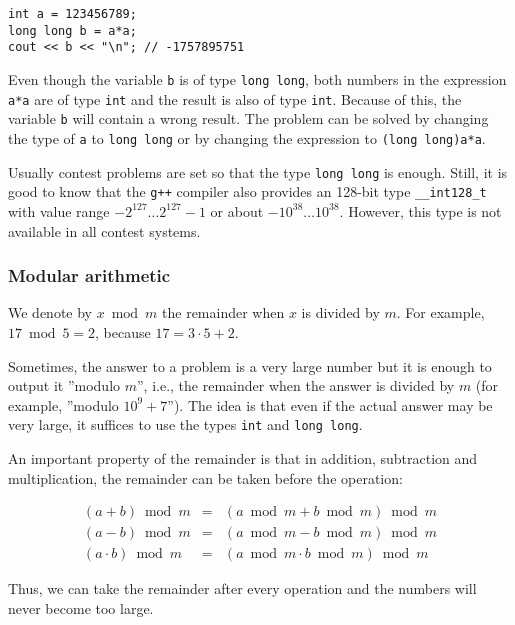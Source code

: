 \begin{lstlisting}
int a = 123456789;
long long b = a*a;
cout << b << "\n"; // -1757895751
\end{lstlisting}

Even though the variable \texttt{b} is of type \texttt{long long},
both numbers in the expression \texttt{a*a}
are of type \texttt{int} and the result is
also of type \texttt{int}.
Because of this, the variable \texttt{b} will
contain a wrong result.
The problem can be solved by changing the type
of \texttt{a} to \texttt{long long} or
by changing the expression to \texttt{(long long)a*a}.

Usually contest problems are set so that the
type \texttt{long long} is enough.
Still, it is good to know that
the \texttt{g++} compiler also provides
an 128-bit type \texttt{\_\_int128\_t}
with value range
$-2^{127} \ldots 2^{127}-1$ or about $-10^{38} \ldots 10^{38}$.
However, this type is not available in all contest systems.

\subsubsection{Modular arithmetic}


We denote by $x \bmod m$ the remainder
when $x$ is divided by $m$.
For example, $17 \bmod 5 = 2$,
because $17 = 3 \cdot 5 + 2$.

Sometimes, the answer to a problem is a
very large number but it is enough to
output it ''modulo $m$'', i.e.,
the remainder when the answer is divided by $m$
(for example, ''modulo $10^9+7$'').
The idea is that even if the actual answer
may be very large,
it suffices to use the types
\texttt{int} and \texttt{long long}.

An important property of the remainder is that
in addition, subtraction and multiplication,
the remainder can be taken before the operation:

\[
\begin{array}{rcr}
(a+b) \bmod m & = & (a \bmod m + b \bmod m) \bmod m \\
(a-b) \bmod m & = & (a \bmod m - b \bmod m) \bmod m \\
(a \cdot b) \bmod m & = & (a \bmod m \cdot b \bmod m) \bmod m
\end{array}
\]

Thus, we can take the remainder after every operation
and the numbers will never become too large.

